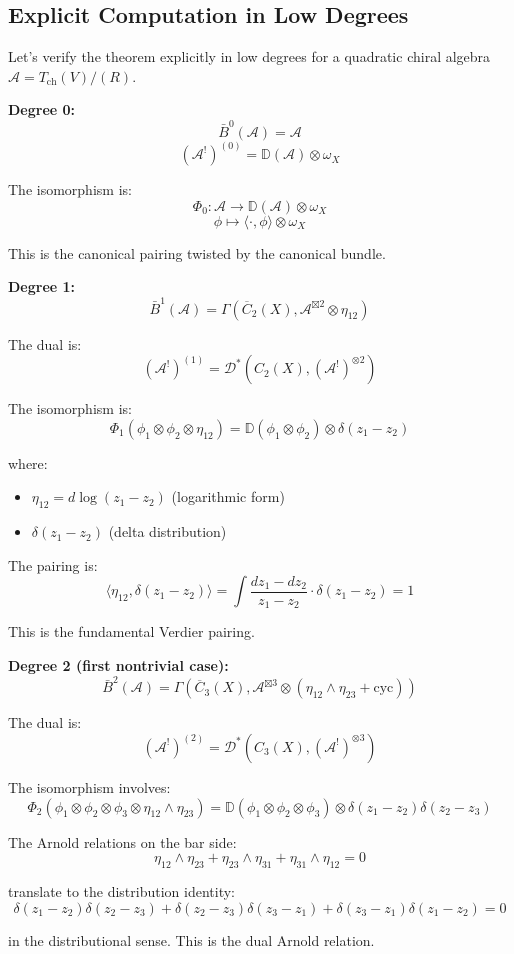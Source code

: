 \subsection{Explicit Computation in Low Degrees}

\begin{computation}\label{comp:bar-dual-low-degrees}
Let's verify the theorem explicitly in low degrees for a quadratic chiral algebra $\mathcal{A} = T_{\text{ch}}(V)/(R)$.

\textbf{Degree 0:}
$$\bar{B}^0(\mathcal{A}) = \mathcal{A}$$
$$(\mathcal{A}^!)^{(0)} = \mathbb{D}(\mathcal{A}) \otimes \omega_X$$

The isomorphism is:
$$\Phi_0: \mathcal{A} \to \mathbb{D}(\mathcal{A}) \otimes \omega_X$$
$$\phi \mapsto \langle \cdot, \phi \rangle \otimes \omega_X$$

This is the canonical pairing twisted by the canonical bundle.

\textbf{Degree 1:}
$$\bar{B}^1(\mathcal{A}) = \Gamma(\overline{C}_2(X), \mathcal{A}^{\boxtimes 2} \otimes \eta_{12})$$

The dual is:
$$(\mathcal{A}^!)^{(1)} = \mathcal{D}^*(C_2(X), (\mathcal{A}^!)^{\otimes 2})$$

The isomorphism is:
$$\Phi_1(\phi_1 \otimes \phi_2 \otimes \eta_{12}) = \mathbb{D}(\phi_1 \otimes \phi_2) \otimes \delta(z_1 - z_2)$$

where:
\begin{itemize}
\item $\eta_{12} = d\log(z_1 - z_2)$ (logarithmic form)
\item $\delta(z_1 - z_2)$ (delta distribution)
\end{itemize}

The pairing is:
$$\langle \eta_{12}, \delta(z_1 - z_2) \rangle = \int \frac{dz_1 - dz_2}{z_1 - z_2} \cdot \delta(z_1 - z_2) = 1$$

This is the fundamental Verdier pairing.

\textbf{Degree 2 (first nontrivial case):}
$$\bar{B}^2(\mathcal{A}) = \Gamma(\overline{C}_3(X), \mathcal{A}^{\boxtimes 3} \otimes (\eta_{12} \wedge \eta_{23} + \text{cyc}))$$

The dual is:
$$(\mathcal{A}^!)^{(2)} = \mathcal{D}^*(C_3(X), (\mathcal{A}^!)^{\otimes 3})$$

The isomorphism involves:
$$\Phi_2(\phi_1 \otimes \phi_2 \otimes \phi_3 \otimes \eta_{12} \wedge \eta_{23}) = \mathbb{D}(\phi_1 \otimes \phi_2 \otimes \phi_3) \otimes \delta(z_1 - z_2) \delta(z_2 - z_3)$$

The Arnold relations on the bar side:
$$\eta_{12} \wedge \eta_{23} + \eta_{23} \wedge \eta_{31} + \eta_{31} \wedge \eta_{12} = 0$$

translate to the distribution identity:
$$\delta(z_1 - z_2)\delta(z_2 - z_3) + \delta(z_2 - z_3)\delta(z_3 - z_1) + \delta(z_3 - z_1)\delta(z_1 - z_2) = 0$$

in the distributional sense. This is the dual Arnold relation.
\end{computation}

